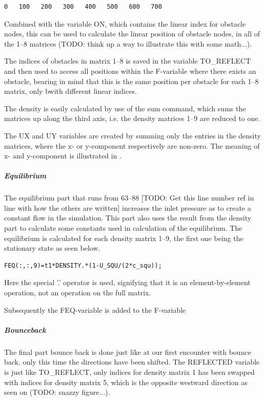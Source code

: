 \begin{verbatim}
0   100   200   300   400   500   600   700
\end{verbatim}

Combined with the variable ON, which contains the linear index for obstacle nodes, this can be used to calculate the linear position of obstacle nodes, in all of the 1--8 matrices (TODO: think up a way to illustrate this with some math...).

The indices of obstacles in matrix 1--8 is saved in the variable TO\_REFLECT and then used to access all positions within the F-variable where there exists an obstacle, bearing in mind that this is the same position per obstacle for each 1--8 matrix, only bwith different linear indices.

The density is easily calculated by use of the sum command, which sums the matrices up along the third axis, i.e. the density matrices 1--9 are reduced to one.

The UX and UY variables are created by summing only the entries in the density matrices, where the x- or y-component respectively are non-zero. The meaning of x- and y-component is illustrated in .


\subparagraph*{Equilibrium}
The equilibrium part that runs from 63--88 [TODO: Get this line number ref in line with how the others are written] increases the inlet pressure as to create a constant flow in the simulation. This part also uses the result from the density part to calculate some constants used in calculation of the equilibrium. The equilibrium is calculated for each density matrix 1--9, the first one being the stationary state as seen below.

\begin{verbatim}
FEQ(:,:,9)=t1*DENSITY.*(1-U_SQU/(2*c_squ));
\end{verbatim}

Here the special '.' operator is used, signifying that it is an element-by-element operation, not an operation on the full matrix.

Subsequently the FEQ-variable is added to the F-variable

\subparagraph*{Bounceback}
The final part bounce back is done just like at our first encounter with bounce back, only this time the directions have been shifted. The REFLECTED variable is just like TO\_REFLECT, only indices for density matrix 1 has been swapped with indices for density matrix 5, which is the opposite westward direction as seen on (TODO: snazzy figure...).




